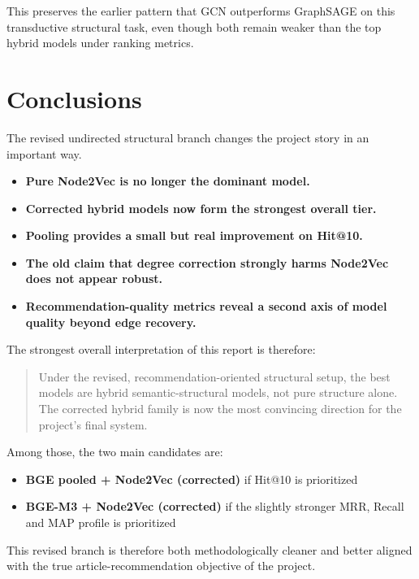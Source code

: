 \documentclass[11pt,a4paper]{article}
\begin{document}
This preserves the earlier pattern that GCN outperforms GraphSAGE on this
transductive structural task, even though both remain weaker than the top hybrid
models under ranking metrics.

\section{Conclusions}
The revised undirected structural branch changes the project story in an
important way.

\begin{itemize}
    \item \textbf{Pure Node2Vec is no longer the dominant model.}
    \item \textbf{Corrected hybrid models now form the strongest overall tier.}
    \item \textbf{Pooling provides a small but real improvement on Hit@10.}
    \item \textbf{The old claim that degree correction strongly harms Node2Vec
          does not appear robust.}
    \item \textbf{Recommendation-quality metrics reveal a second axis of model
          quality beyond edge recovery.}
\end{itemize}

The strongest overall interpretation of this report is therefore:

\begin{quote}
Under the revised, recommendation-oriented structural setup, the best models are
hybrid semantic-structural models, not pure structure alone. The corrected
hybrid family is now the most convincing direction for the project's final
system.
\end{quote}

Among those, the two main candidates are:

\begin{itemize}
    \item \textbf{BGE pooled + Node2Vec (corrected)} if Hit@10 is prioritized
    \item \textbf{BGE-M3 + Node2Vec (corrected)} if the slightly stronger MRR,
          Recall and MAP profile is prioritized
\end{itemize}

This revised branch is therefore both methodologically cleaner and better
aligned with the true article-recommendation objective of the project.
\end{document}
